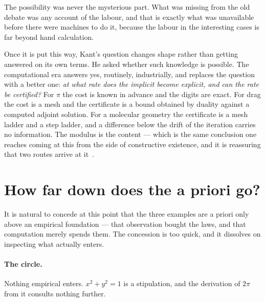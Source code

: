 \documentclass[11pt]{article}
\begin{document}
The possibility was never the mysterious part. What was missing from the old debate was any account
of the labour, and that is exactly what was unavailable before there were machines to do it, because
the labour in the interesting cases is far beyond hand calculation.

Once it is put this way, Kant's question changes shape rather than getting answered on its own
terms. He asked whether such knowledge is possible. The computational era answers yes, routinely,
industrially, and replaces the question with a better one: \emph{at what rate does the implicit
become explicit, and can the rate be certified?} For $\pi$ the cost is known in advance and the
digits are exact. For drag the cost is a mesh and the certificate is a bound obtained by duality
against a computed adjoint solution. For a molecular geometry the certificate is a mesh ladder and a
step ladder, and a difference below the drift of the iteration carries no information. The modulus
is the content --- which is the same conclusion one reaches coming at this from the side of
constructive existence, and it is reassuring that two routes arrive at it~\cite{constructive}.

\section{How far down does the a priori go?}\label{sec:kernel}

It is natural to concede at this point that the three examples are a priori only above an empirical
foundation --- that observation bought the laws, and that computation merely spends them. The
concession is too quick, and it dissolves on inspecting what actually enters.

\paragraph{The circle.} Nothing empirical enters. $x^2+y^2=1$ is a stipulation, and the derivation
of $2\pi$ from it consults nothing further.
\end{document}

